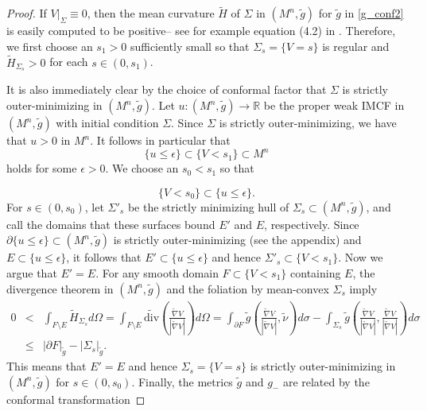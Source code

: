 \documentclass[12pt,twoside]{article}
\theoremstyle{plain}
\theoremstyle{definition}
\theoremstyle{remark}
\numberwithin{equation}{section}
\begin{document}
\begin{proof}
If $V|_{\Sigma} \equiv 0$, then the mean curvature $\widetilde{H}$ of $\Sigma$ in $(M^{n},\widetilde{g})$ for $\widetilde{g}$ in \eqref{g_conf2} is easily computed to be positive-- see for example equation (4.2) in \cite{Rau}. Therefore, we first choose an $s_{1} >0$ sufficiently small so that $\Sigma_{s}=\{ V=s \}$ is regular and $\widetilde{H}_{\Sigma_{s}} >0$ for each $s \in (0,s_{1})$. 

It is also immediately clear by the choice of conformal factor that $\Sigma$ is strictly outer-minimizing in $(M^{n},\widetilde{g})$. Let $u: (M^{n},\widetilde{g}) \rightarrow \mathbb{R}$ be the proper weak IMCF in $(M^{n},\widetilde{g})$ with initial condition $\Sigma$. Since $\Sigma$ is strictly outer-minimizing, we have that $u > 0$ in $M^{n}$. It follows in particular that
\begin{equation}
\{ u \leq \epsilon \} \subset \{ V < s_{1}\} \subset M^{n}
\end{equation}
holds for some $\epsilon>0$. We choose an $s_{0} < s_{1}$ so that

\begin{equation}
\{ V < s_{0} \} \subset \{ u \leq \epsilon \}.
\end{equation}
For $s \in (0,s_{0})$, let $\Sigma'_{s}$ be the strictly minimizing hull of $\Sigma_{s} \subset (M^{n},\widetilde{g})$, and call the domains that these surfaces bound $E'$ and $E$, respectively. Since $\partial \{ u \leq \epsilon \} \subset (M^{n},\widetilde{g})$ is strictly outer-minimizing (see the appendix) and $E \subset \{ u \leq \epsilon \}$, it follows that $E' \subset \{ u \leq \epsilon \}$ and hence $\Sigma'_{s} \subset \{ V < s_{1} \}$. Now we argue that $E'=E$. For any smooth domain $F \subset \{ V < s_{1} \}$ containing $E$, the divergence theorem in $(M^{n},\widetilde{g})$ and the foliation by mean-convex $\Sigma_{s}$ imply
\begin{eqnarray*}
   0 &<& \int_{F \setminus E} \widetilde{H}_{\Sigma_{s}} d\Omega = \int_{F \setminus E} \widetilde{\text{div}} \left( \frac{\widetilde{\nabla} V}{|\widetilde{\nabla} V|} \right) d\Omega = \int_{\partial F}   \widetilde{g} \left( \frac{\widetilde{\nabla} V}{|\widetilde{\nabla} V|}, \widetilde{\nu} \right) d\sigma - \int_{\Sigma_{s}} \widetilde{g} \left( \frac{\widetilde{\nabla} V}{|\widetilde{\nabla} V|}, \frac{\widetilde{\nabla} V}{|\widetilde{\nabla} V|} \right) d\sigma \\
   & \leq & |\partial F|_{\widetilde{g}} - |\Sigma_{s}|_{\widetilde{g}}.
\end{eqnarray*}
This means that $E'=E$ and hence $\Sigma_{s}=\{ V = s\}$ is strictly outer-minimizing in $(M^{n},\widetilde{g})$ for $s \in (0,s_{0})$. Finally, the metrics $\widetilde{g}$ and $g_{-}$ are related by the conformal transformation


\end{proof}
\end{document}
